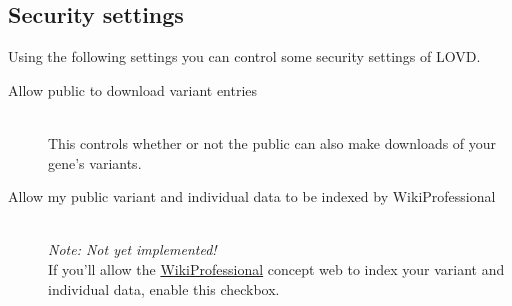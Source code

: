 \documentclass[a4paper,oneside,openany,12pt]{memoir}
\begin{document}
\subsection{Security settings}
Using the following settings you can control some security settings of LOVD.
\begin{description}
  \item[Allow public to download variant entries] \hfill \\
  This controls whether or not the public can also make downloads of your gene's variants.
  \item[Allow my public variant and individual data to be indexed by WikiProfessional] \hfill \\
  \emph{Note: Not yet implemented!}
  \\
  If you'll allow the \href{http://www.wikiprofessional.org/}{WikiProfessional} concept web to index your variant and individual data, enable this checkbox.
\end{description}





\hypertarget{s_gene_homepage}{}
\end{document}
